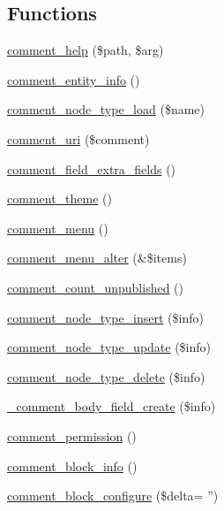 \subsection*{Functions}
\begin{DoxyCompactItemize}
\item 
\hyperlink{comment_8module_a63915d30d11256dcdcd0c7e170aeefcd}{comment\_\-help} (\$path, \$arg)
\item 
\hyperlink{comment_8module_a4cdb7636ced52ebf5d0af7dd42ca83d1}{comment\_\-entity\_\-info} ()
\item 
\hyperlink{comment_8module_a05a5d2b61a4656fba57a93489c4bcd3b}{comment\_\-node\_\-type\_\-load} (\$name)
\item 
\hyperlink{comment_8module_a40e0250c18ea32c201bb1abef9bb1a0a}{comment\_\-uri} (\$comment)
\item 
\hyperlink{comment_8module_ae1d74e0f7764e4be5fa2fa6d66b12e3c}{comment\_\-field\_\-extra\_\-fields} ()
\item 
\hyperlink{comment_8module_a55ab29f2d9bfd7b05965e42a9fde98b7}{comment\_\-theme} ()
\item 
\hyperlink{comment_8module_a94a9be33c58ee31519a160b07d52d4d0}{comment\_\-menu} ()
\item 
\hyperlink{comment_8module_a8ba809cd66487e3390673abf3fde59a9}{comment\_\-menu\_\-alter} (\&\$items)
\item 
\hyperlink{comment_8module_a820a1c431691e6fe98c711d9a55b8081}{comment\_\-count\_\-unpublished} ()
\item 
\hyperlink{comment_8module_a7a86654032864f38a6c672c7fd0a15d9}{comment\_\-node\_\-type\_\-insert} (\$info)
\item 
\hyperlink{comment_8module_a8019cc0abaad27a1b5e5086f60a3c9ab}{comment\_\-node\_\-type\_\-update} (\$info)
\item 
\hyperlink{comment_8module_a91ec97379602d78b57140003c9d380f4}{comment\_\-node\_\-type\_\-delete} (\$info)
\item 
\hyperlink{comment_8module_a202aee66aac992dace1513fcf1432562}{\_\-comment\_\-body\_\-field\_\-create} (\$info)
\item 
\hyperlink{comment_8module_a387b3124043febad12f7f0aff06a1443}{comment\_\-permission} ()
\item 
\hyperlink{comment_8module_a5ae66e2c95e26f6694418807241fac4c}{comment\_\-block\_\-info} ()
\item 
\hyperlink{comment_8module_a3da253fa805d0d75f18d87635dbb562a}{comment\_\-block\_\-configure} (\$delta= '')
\item 

\end{DoxyCompactItemize}
